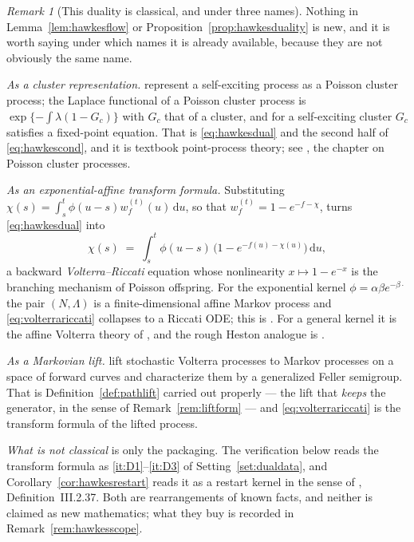\documentclass[11pt,a4paper]{article}
\theoremstyle{plain}
\theoremstyle{definition}
\theoremstyle{remark}
\newtheorem{remark}[theorem]{Remark}
\newcommand{\HO}{\cite{HO74}}
\newcommand{\ALP}{\cite{ALP19}}
\newcommand{\CT}{\cite{CT20}}
\newcommand{\DVJ}{\cite{DVJ03}}
\newcommand{\dif}{\,\mathrm{d}}
\newcommand{\JS}{\cite{JS03}}
\begin{document}
\begin{remark}[This duality is classical, and under three names]
  \label{rem:hawkesknown}
  Nothing in Lemma~\ref{lem:hawkesflow} or
  Proposition~\ref{prop:hawkesduality} is new, and it is worth saying under which
  names it is already available, because they are not obviously the same name.

  \emph{As a cluster representation.}  \HO{} represent a self-exciting process as
  a Poisson cluster process; the Laplace functional of a Poisson cluster process
  is $\exp\{-\int\lambda(1-G_c)\}$ with $G_c$ that of a cluster, and for a
  self-exciting cluster $G_c$ satisfies a fixed-point equation.  That is
  \eqref{eq:hawkesdual} and the second half of \eqref{eq:hawkescond}, and it is
  textbook point-process theory; see \DVJ, the chapter on Poisson cluster
  processes.

  \emph{As an exponential-affine transform formula.}  Substituting
  $\chi(s) = \int_s^t \phi(u-s) w^{(t)}_f(u)\dif u$, so that
  $w^{(t)}_f = 1 - e^{-f-\chi}$, turns \eqref{eq:hawkesdual} into
  \begin{equation}
    \label{eq:volterrariccati}
    \chi(s) \;=\; \int_s^t \phi(u-s) \,
      \bigl( 1 - e^{-f(u)-\chi(u)} \bigr) \dif u ,
  \end{equation}
  a backward \emph{Volterra--Riccati} equation whose nonlinearity
  $x \mapsto 1-e^{-x}$ is the branching mechanism of Poisson offspring.  For the
  exponential kernel $\phi = \alpha\beta e^{-\beta\cdot}$ the pair
  $(N,\Lambda)$ is a finite-dimensional affine Markov process and
  \eqref{eq:volterrariccati} collapses to a Riccati ODE; this is \cite{EGG10}.
  For a general kernel it is the affine Volterra theory of \ALP, and the rough
  Heston analogue is \cite{ER19}.

  \emph{As a Markovian lift.}  \CT{} lift stochastic Volterra processes to
  Markov processes on a space of forward curves and characterize them by a
  generalized Feller semigroup.  That is Definition~\ref{def:pathlift} carried
  out properly --- the lift that \emph{keeps} the generator, in the sense of
  Remark~\ref{rem:liftform} --- and \eqref{eq:volterrariccati} is the transform
  formula of the lifted process.

  \emph{What is not classical} is only the packaging.  The verification below
  reads the transform formula as \ref{it:D1}--\ref{it:D3} of
  Setting~\ref{set:dualdata}, and Corollary~\ref{cor:hawkesrestart} reads it as a
  restart kernel in the sense of \JS, Definition~III.2.37.  Both are
  rearrangements of known facts, and neither is claimed as new mathematics; what
  they buy is recorded in Remark~\ref{rem:hawkesscope}.
\end{remark}
\end{document}
